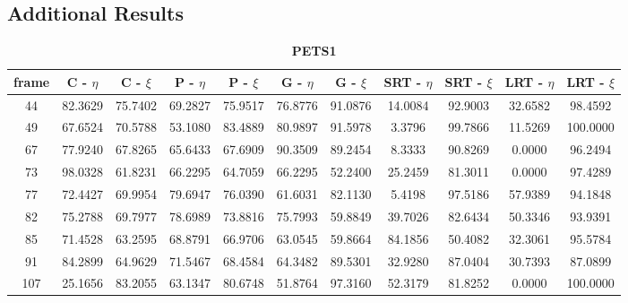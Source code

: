 \clearpage
\begin{appendices}



\chapter{Additional Results}

\begin{table}
\centering
\caption{\textbf{PETS1}}
\begin{tabular}{ |c|c|c|c|c|c|c|c|c|c|c| }
	\hline
\textbf{frame} &  \textbf{C - $\eta$} &  \textbf{C - $\xi$} &  \textbf{P - $\eta$} &  \textbf{P - $\xi$} &  \textbf{G - $\eta$} &  \textbf{G - $\xi$} &  \textbf{SRT - $\eta$} &  \textbf{SRT - $\xi$} &  \textbf{LRT - $\eta$} &  \textbf{LRT - $\xi$} \\
\hline
\hline
44 & 82.3629 &  75.7402 &   69.2827 &  75.9517 &   76.8776 &  91.0876 &   14.0084 &  92.9003 &   32.6582 &  98.4592 \\
\hline
49 & 67.6524 &  70.5788 &   53.1080 &  83.4889 &   80.9897 &  91.5978 &   3.3796 &  99.7866 &   11.5269 &  100.0000 \\
\hline
67 & 77.9240 &  67.8265 &   65.6433 &  67.6909 &   90.3509 &  89.2454 &   8.3333 &  90.8269 &   0.0000 &  96.2494 \\
\hline
73 & 98.0328 &  61.8231 &   66.2295 &  64.7059 &   66.2295 &  52.2400 &   25.2459 &  81.3011 &   0.0000 &  97.4289 \\
\hline
77 & 72.4427 &  69.9954 &   79.6947 &  76.0390 &   61.6031 &  82.1130 &   5.4198 &  97.5186 &   57.9389 &  94.1848 \\
\hline
82 & 75.2788 &  69.7977 &   78.6989 &  73.8816 &   75.7993 &  59.8849 &   39.7026 &  82.6434 &   50.3346 &  93.9391 \\
\hline
85 & 71.4528 &  63.2595 &   68.8791 &  66.9706 &   63.0545 &  59.8664 &   84.1856 &  50.4082 &   32.3061 &  95.5784 \\
\hline
91 & 84.2899 &  64.9629 &   71.5467 &  68.4584 &   64.3482 &  89.5301 &   32.9280 &  87.0404 &   30.7393 &  87.0899 \\
\hline
107 & 25.1656 &  83.2055 &   63.1347 &  80.6748 &   51.8764 &  97.3160 &   52.3179 &  81.8252 &   0.0000 &  100.0000 \\

\end{tabular}
\end{table}
\end{appendices}
